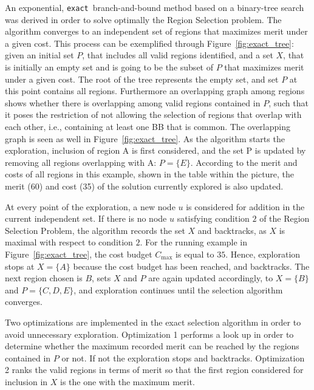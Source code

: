 \documentclass[]{usiinfthesis}
\newcommand{\exact}{\texttt{exact}}
\begin{document}
An exponential, \exact\ branch-and-bound method
based on a binary-tree search was derived in order to solve optimally 
the Region Selection problem. The algorithm converges to an
independent set of regions that maximizes merit under 
a given cost.
This process can be exemplified through
 Figure~\ref{fig:exact_tree}: given an initial set $P$, that includes all
 valid regions identified, and a set $X$, that is initially an empty set and 
is going to be the subset of $P$ that maximizes merit under a given cost.
The root of the tree represents the empty set, and set $P$ at this
point contains all regions. Furthermore an overlapping graph among regions 
shows whether there is overlapping among valid regions contained in $P$, 
such that it poses the restriction of not allowing the selection of regions 
that overlap with each other, i.e., containing at least one BB that is common. 
The overlapping graph is seen as well in Figure~\ref{fig:exact_tree}.
As the algorithm starts the exploration, inclusion of region A is first
considered, and the set P is updated by removing all regions overlapping
with A: $P = \{E\}$. According to the merit and costs of all regions
in this example, shown in the table within the picture, the merit (60)
and cost (35) of the solution currently explored is also updated.\par

At every point of the exploration, a new node $u$ is considered for
addition in the current independent set.
If there is no node $u$
satisfying condition $2$ of the Region Selection Problem, the algorithm
records the set $X$ and backtracks, as $X$ is maximal with respect to
condition $2$.  For the running example in
Figure~\ref{fig:exact_tree}, the cost budget $C_{\max}$ is equal to
$35$. Hence, exploration stops at $X=\{A\}$ because the cost budget
has been reached, and backtracks. The next region chosen is $B$, sets
$X$ and $P$ are again updated accordingly, to $X=\{B\}$ and
$P=\{C,D,E\}$, and exploration continues until the selection algorithm
converges.\par

Two optimizations are implemented in the exact selection algorithm in order 
to avoid unnecessary exploration. Optimization 1 performs a look up in order 
to determine whether the maximum recorded merit can be reached by the 
regions contained in $P$ or not. If not the exploration stops and backtracks.
Optimization 2 ranks the valid regions in terms of merit so that the first 
region considered for inclusion in $X$ is the one with the maximum merit.
\end{document}
